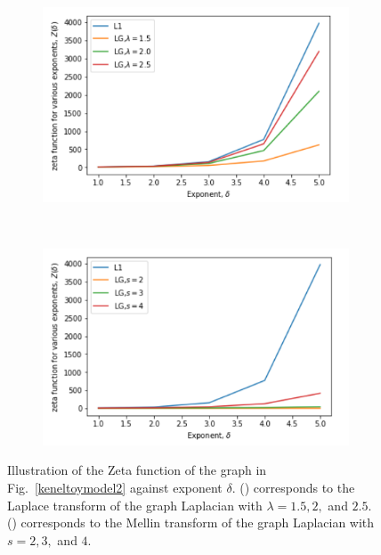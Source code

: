 \documentclass[10pt,a4paper]{article}
\begin{document}
        \begin{figure}[H]
        	\centering
        	\begin{subfigure}[b]{0.35\textwidth}
        		\includegraphics[width= \textwidth]{images/zeta-laplace2.png}
        		\caption{}
        		\label{zeta-laplace}
        	\end{subfigure}~
        	\begin{subfigure}[b]{0.35\textwidth}
        		\includegraphics[width= \textwidth]{images/zeta-mellin2.png}
        		\caption{}
        		\label{zeta-mellin}
        	\end{subfigure} 
        	\caption{Illustration of the Zeta function of the graph in Fig.~\ref{keneltoymodel2} against exponent $\delta$. () corresponds to the Laplace transform of the graph Laplacian with $\lambda = 1.5, 2,$ and $2.5$. () corresponds to the Mellin transform of the graph Laplacian with $s = 2, 3,$ and $4$. }
        	\label{}
        \end{figure}
        
\end{document}
